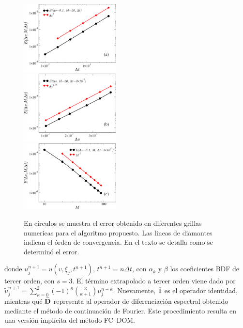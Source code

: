 \begin{figure}
  \includegraphics[width=0.45\textwidth]{figuras/errdt.pdf}\\
  \vspace{2mm}
  \includegraphics[width=0.45\textwidth]{figuras/errdx.pdf}\\
  \vspace{2mm}
  \includegraphics[width=0.45\textwidth]{figuras/xiconv.pdf}
  \caption{En círculos 
  se muestra el error obtenido en diferentes grillas numericas para el algoritmo 
  propuesto. Las lineas 
  de diamantes indican el órden de convergencia. En el texto se detalla 
  como se determinó el error.}
 \label{fig:conv}
\end{figure}
donde $u^{n+1}_j=u(v,\xi_j,t^{n+1})$, $t^{n+1}=n\Delta t$, con $\alpha_k$ y $\beta$ 
los coeficientes BDF de tercer orden, con $s=3$. El término extrapolado 
a tercer orden viene dado por $\tilde{u}_j^{n+1}=\sum_{\kappa=0}^{2}(-1)^\kappa {3 \choose \kappa+1} u_j^{n-\kappa}$. Nuevamente, 
$\bar{\mathbf{1}}$ es el operador identidad, mientras qué $\bar{\mathbf{D}}$ representa al operador 
de diferenciación espectral obtenido mediante el método de continuación de Fourier. Este procedimiento resulta en una versión implícita 
del método FC--DOM. 

